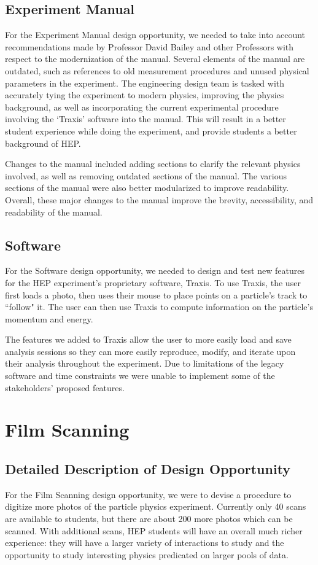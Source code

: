 \documentclass[12pt]{article} %
\begin{document}
\subsection{Experiment Manual}
For the Experiment Manual design opportunity, we needed to take into account recommendations made by Professor David Bailey and other Professors with respect to the modernization of the manual. Several elements of the manual are outdated, such as references to old measurement procedures and unused physical parameters in the experiment. The engineering design team is tasked with accurately tying the experiment to modern physics, improving the physics background, as well as incorporating the current experimental procedure involving the `Traxis' software into the manual. This will result in a better student experience while doing the experiment, and provide students a better background of HEP. 

Changes to the manual included adding sections to clarify the relevant physics involved, as well as removing outdated sections of the manual. The various sections of the manual were also better modularized to improve readability. Overall, these major changes to the manual improve the brevity, accessibility, and readability of the manual.

\subsection{Software}
For the Software design opportunity, we needed to design and test new features for the HEP experiment's proprietary software, Traxis. To use Traxis, the user first loads a photo, then uses their mouse to place points on a particle's track to ``follow" it. The user can then use Traxis to compute information on the particle's momentum and energy.

The features we added to Traxis allow the user to more easily load and save analysis sessions so they can more easily reproduce, modify, and iterate upon their analysis throughout the experiment. Due to limitations of the legacy software and time constraints we were unable to implement some of the stakeholders' proposed features. 

\newpage \section{Film Scanning}
\subsection{Detailed Description of Design Opportunity}
For the Film Scanning design opportunity, we were to devise a procedure to digitize more photos of the particle physics experiment. Currently only 40 scans are available to students, but there are about 200 more photos which can be scanned. With additional scans, HEP students will have an overall much richer experience: they will have a larger variety of interactions to study and the opportunity to study interesting physics predicated on larger pools of data.
\end{document}
